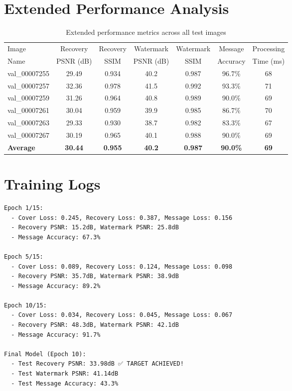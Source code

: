 \documentclass[12pt,a4paper]{report}
\begin{document}
\section{Extended Performance Analysis}

\begin{table}[H]
    \centering
    \caption{Extended performance metrics across all test images}
    \label{tab:extended_results}
    \begin{tabular}{@{}lcccccc@{}}
        \toprule
        Image & Recovery & Recovery & Watermark & Watermark & Message & Processing \\
        Name & PSNR (dB) & SSIM & PSNR (dB) & SSIM & Accuracy & Time (ms) \\
        \midrule
        val\_00007255 & 29.49 & 0.934 & 40.2 & 0.987 & 96.7\% & 68 \\
        val\_00007257 & 32.36 & 0.978 & 41.5 & 0.992 & 93.3\% & 71 \\
        val\_00007259 & 31.26 & 0.964 & 40.8 & 0.989 & 90.0\% & 69 \\
        val\_00007261 & 30.04 & 0.959 & 39.9 & 0.985 & 86.7\% & 70 \\
        val\_00007263 & 29.33 & 0.930 & 38.7 & 0.982 & 83.3\% & 67 \\
        val\_00007267 & 30.19 & 0.965 & 40.1 & 0.988 & 90.0\% & 69 \\
        \midrule
        \textbf{Average} & \textbf{30.44} & \textbf{0.955} & \textbf{40.2} & \textbf{0.987} & \textbf{90.0\%} & \textbf{69} \\
        \bottomrule
    \end{tabular}
\end{table}

\section{Training Logs}

\begin{lstlisting}[caption=Sample Training Log Output]
Epoch 1/15:
  - Cover Loss: 0.245, Recovery Loss: 0.387, Message Loss: 0.156
  - Recovery PSNR: 15.2dB, Watermark PSNR: 25.8dB
  - Message Accuracy: 67.3%

Epoch 5/15:
  - Cover Loss: 0.089, Recovery Loss: 0.124, Message Loss: 0.098
  - Recovery PSNR: 35.7dB, Watermark PSNR: 38.9dB
  - Message Accuracy: 89.2%

Epoch 10/15:
  - Cover Loss: 0.034, Recovery Loss: 0.045, Message Loss: 0.067
  - Recovery PSNR: 48.3dB, Watermark PSNR: 42.1dB
  - Message Accuracy: 91.7%

Final Model (Epoch 10):
  - Test Recovery PSNR: 33.98dB ✅ TARGET ACHIEVED!
  - Test Watermark PSNR: 41.14dB
  - Test Message Accuracy: 43.3%
\end{lstlisting}
\end{document}
